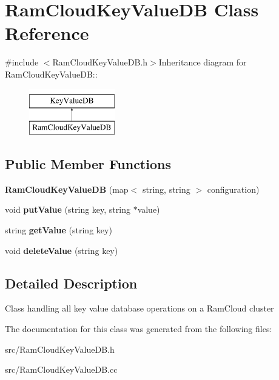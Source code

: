 \hypertarget{classRamCloudKeyValueDB}{
\section{RamCloudKeyValueDB Class Reference}
\label{classRamCloudKeyValueDB}
}


{\ttfamily \#include $<$RamCloudKeyValueDB.h$>$}Inheritance diagram for RamCloudKeyValueDB::\begin{figure}[H]
\begin{center}
\leavevmode
\includegraphics[height=2cm]{classRamCloudKeyValueDB}
\end{center}
\end{figure}
\subsection*{Public Member Functions}
\begin{DoxyCompactItemize}
\item 
\hypertarget{classRamCloudKeyValueDB_a597bb6fbbe622334c35cbe6a165bdb0f}{
{\bfseries RamCloudKeyValueDB} (map$<$ string, string $>$ configuration)}
\label{classRamCloudKeyValueDB_a597bb6fbbe622334c35cbe6a165bdb0f}

\item 
\hypertarget{classRamCloudKeyValueDB_a6e1b871add53feb0a0a738933df4898d}{
void {\bfseries putValue} (string key, string $\ast$value)}
\label{classRamCloudKeyValueDB_a6e1b871add53feb0a0a738933df4898d}

\item 
\hypertarget{classRamCloudKeyValueDB_ae46ce3504ba964b9d1f689111e67e495}{
string {\bfseries getValue} (string key)}
\label{classRamCloudKeyValueDB_ae46ce3504ba964b9d1f689111e67e495}

\item 
\hypertarget{classRamCloudKeyValueDB_abc2870c0eda566962c46b2ef6493addc}{
void {\bfseries deleteValue} (string key)}
\label{classRamCloudKeyValueDB_abc2870c0eda566962c46b2ef6493addc}

\end{DoxyCompactItemize}


\subsection{Detailed Description}
Class handling all key value database operations on a RamCloud cluster 

The documentation for this class was generated from the following files:\begin{DoxyCompactItemize}
\item 
src/RamCloudKeyValueDB.h\item 
src/RamCloudKeyValueDB.cc\end{DoxyCompactItemize}
